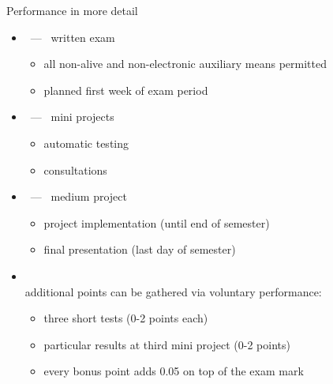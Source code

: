 \begin{frame}[c]{Performance in more detail}
  \begin{itemize}
  \item<1->  \ --- \ \alert{written exam}
    \begin{itemize}
    \item all non-alive and non-electronic auxiliary means permitted
    \item planned first week of exam period
    \end{itemize}
    \medskip
  \item<1->  \ --- \ \alert{mini projects}
    \begin{itemize}
    \item automatic testing
    \item consultations
    \end{itemize}
    \medskip
  \item<2->  \ --- \ \alert{medium project}
    \begin{itemize}
    \item project implementation  (until end of semester)
    \item final presentation (last day of semester)
    \end{itemize}
    \medskip
  \item<3-> \\
    additional points can be gathered via voluntary performance:
    \begin{itemize}
    \item three short tests  (0-2 points each)
    \item particular results at third mini project (0-2 points)
    \item every bonus point adds 0.05 on top of the exam mark
    \end{itemize}
  \end{itemize}
\end{frame}
%
